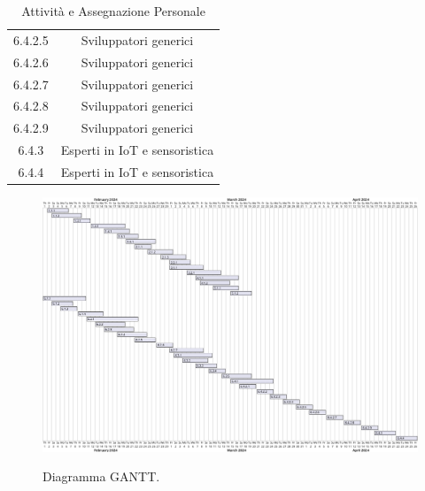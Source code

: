 \begin{table}[H]
\begin{tabular}{|c|c|}
        6.4.2.5           & Sviluppatori generici                                    \\
        6.4.2.6           & Sviluppatori generici                                    \\
        6.4.2.7           & Sviluppatori generici                                    \\
        6.4.2.8           & Sviluppatori generici                                    \\
        6.4.2.9           & Sviluppatori generici                                    \\
        6.4.3             & Esperti in IoT e sensoristica                            \\
        6.4.4             & Esperti in IoT e sensoristica                            \\
        \hline
    \end{tabular}
    \caption{Attività e Assegnazione Personale}
    \label{tab:attivita-personale}
\end{table}

\begin{figure}[H]
    \centering
    \caption{Diagramma GANTT.}
    \includegraphics[height=\textwidth, angle=90]{figures/GANTT.png}
    \label{fig:gantt}
\end{figure}

